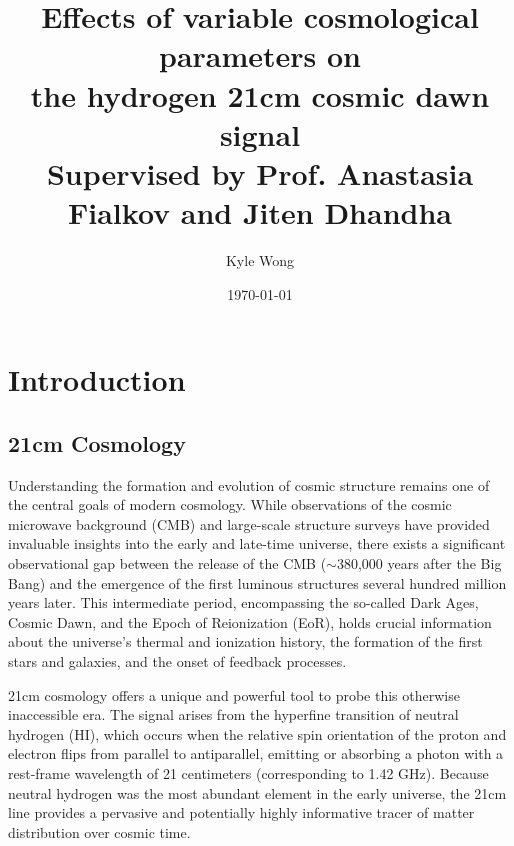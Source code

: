 \documentclass[floats,floatfix,showpacs,amssymb,prd,superscriptaddress,nofootinbib]{revtex4-2} %
\begin{document}
\title{{\titlefont Effects of variable cosmological parameters on
\\the hydrogen 21cm cosmic dawn signal}\\{\small Supervised by Prof. Anastasia Fialkov and Jiten Dhandha}}
\date{\today}
\author{Kyle Wong}


\maketitle
\section{Introduction}
\subsection{21cm Cosmology}
Understanding the formation and evolution of cosmic structure remains one of the central goals of modern cosmology. While observations of the cosmic microwave background (CMB) and large-scale structure surveys have provided invaluable insights into the early and late-time universe, there exists a significant observational gap between the release of the CMB ($\sim$380,000 years after the Big Bang) and the emergence of the first luminous structures several hundred million years later. This intermediate period, encompassing the so-called Dark Ages, Cosmic Dawn, and the Epoch of Reionization (EoR), holds crucial information about the universe's thermal and ionization history, the formation of the first stars and galaxies, and the onset of feedback processes.

21cm cosmology offers a unique and powerful tool to probe this otherwise inaccessible era. The signal arises from the hyperfine transition of neutral hydrogen (HI), which occurs when the relative spin orientation of the proton and electron flips from parallel to antiparallel, emitting or absorbing a photon with a rest-frame wavelength of 21 centimeters (corresponding to 1.42 GHz). Because neutral hydrogen was the most abundant element in the early universe, the 21cm line provides a pervasive and potentially highly informative tracer of matter distribution over cosmic time.
\end{document}
